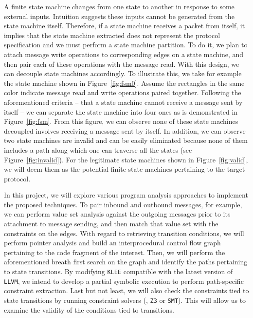 A finite state machine changes from one state to another in response to some
external inputs. Intuition suggests these inputs cannot be generated from the
state machine itself. Therefore, if a state machine receives a packet from
itself, it implies that the state machine extracted does not represent the
protocol specification and we must perform a state machine partition. To do it,
we plan to attach message write operations to corresponding edges on a state
machine, and then pair each of these operations with the message read. With this
design, we can decouple state machines accordingly. To illustrate this, we take
for example the state machine shown in Figure~\ref{fig:fsm0}. Assume the
rectangles in the same color indicate message read and write operations paired
together. Following the aforementioned criteria -- that a state machine cannot
receive a message sent by itself -- we can separate the state machine into four
ones as is demonstrated in Figure~\ref{fig:fsm}. From this figure, we can
observe none of these state machines decoupled involves receiving a message sent
by itself. In addition, we can observe two state machines are invalid and can be
easily eliminated because none of them includes a path along which one can
traverse all the states (see Figure~\ref{fig:invalid}). For the legitimate state
machines shown in Figure~\ref{fig:valid}, we will deem them as 
the potential finite state
machines pertaining to the target protocol.

In this project, we will explore various program analysis approaches to
implement the proposed techniques. To pair inbound and outbound messages, for
example, we can perform value set analysis against the outgoing messages prior
to its attachment to message sending, and then match that value set with the
constraints on the edges. With regard to retrieving transition conditions, we
will perform pointer analysis and build an interprocedural control flow graph
pertaining to the code fragment of the interest. Then, we will perform the
aforementioned breath first search on the graph and identify the paths
pertaining to state transitions. By modifying \texttt{KLEE} compatible with the
latest version of \texttt{LLVM}, we intend to develop a partial symbolic
execution to perform path-specific constraint extraction. Last but not least, we
will also check the constraints tied to state transitions by running constraint
solvers (\eg, \texttt{Z3} or \texttt{SMT}). This will allow us to examine the
validity of the conditions tied to transitions.

